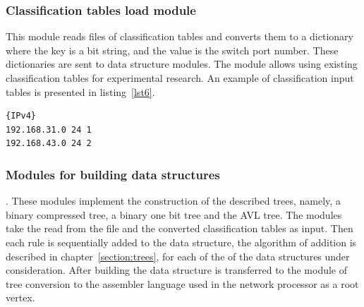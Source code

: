 \documentclass[conference]{IEEEtran}
\begin{document}
            \subsubsection{Classification tables load module}
            \label{section:tablemod}
                This module reads files of classification tables and converts them to a dictionary where the key is a bit string,
                and the value is the switch port number. These dictionaries are sent to data structure modules.
                The module allows using existing classification tables for experimental research.
                An example of classification input tables is presented in listing~\ref{lst6}.
                \\
\begin{lstlisting}[caption=Example of classification table., label=lst6]
{IPv4}
192.168.31.0 24 1
192.168.43.0 24 2
\end{lstlisting}
            \subsubsection{Modules for building data structures}.
                These modules implement the construction of the described trees, namely, 
                a binary compressed tree, a binary one bit tree and the AVL tree.
                The modules take the read from the file and the converted classification tables as input.
                Then each rule is sequentially added to the data structure, 
                the algorithm of addition is described in chapter~\ref{section:trees}, 
                for each of the of the data structures under consideration.
                After building the data structure is transferred to the module 
                of tree conversion to the assembler language used in the network processor as a root vertex.
\end{document}
